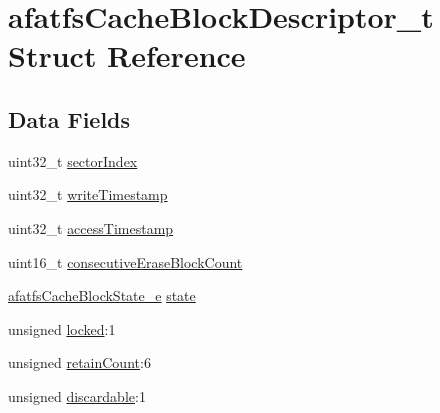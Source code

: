 \hypertarget{structafatfsCacheBlockDescriptor__t}{\section{afatfs\+Cache\+Block\+Descriptor\+\_\+t Struct Reference}
\label{structafatfsCacheBlockDescriptor__t}
}
\subsection*{Data Fields}
\begin{DoxyCompactItemize}
\item 
uint32\+\_\+t \hyperlink{structafatfsCacheBlockDescriptor__t_a32111a9dcafa0861e0d313153a9f927e}{sector\+Index}
\item 
uint32\+\_\+t \hyperlink{structafatfsCacheBlockDescriptor__t_aa3dd431bf0466c90f8e3cf47720027c9}{write\+Timestamp}
\item 
uint32\+\_\+t \hyperlink{structafatfsCacheBlockDescriptor__t_a46f67960c2b260e682a05d836a9c47b0}{access\+Timestamp}
\item 
uint16\+\_\+t \hyperlink{structafatfsCacheBlockDescriptor__t_a30b9fa304fd98e330761469047525979}{consecutive\+Erase\+Block\+Count}
\item 
\hyperlink{asyncfatfs_8c_ab44039d73f0befcaeec7956e693c8e2f}{afatfs\+Cache\+Block\+State\+\_\+e} \hyperlink{structafatfsCacheBlockDescriptor__t_aca710302a4605763dfff898e1c7288be}{state}
\item 
unsigned \hyperlink{structafatfsCacheBlockDescriptor__t_a95afc31369b3f129041135b05d4aa3b1}{locked}\+:1
\item 
unsigned \hyperlink{structafatfsCacheBlockDescriptor__t_aec34e26e5206f53ab1c4b40e67a12254}{retain\+Count}\+:6
\item 
unsigned \hyperlink{structafatfsCacheBlockDescriptor__t_acc2b441deba8fd3b5306b4f3fe97cb26}{discardable}\+:1
\end{DoxyCompactItemize}


